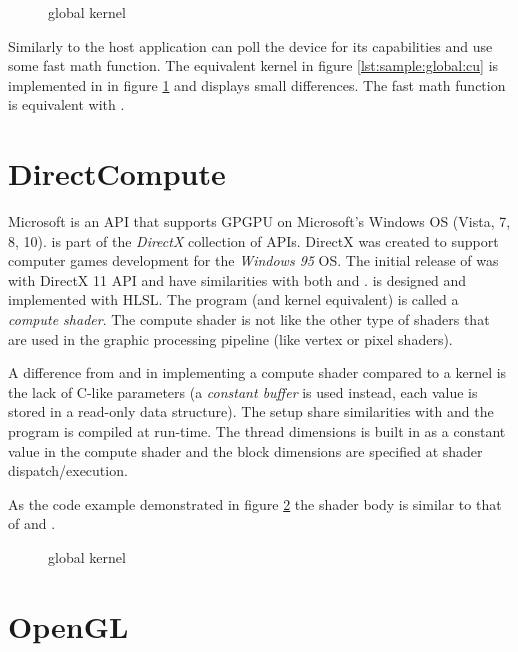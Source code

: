 \begin{figure}
	\centering
	\fbox{}
	\caption{{\OCL} global kernel}
	\label{lst:sample:global:ocl}	
\end{figure}

Similarly to {\CU} the host application can poll the device for its capabilities and use some fast math function. The equivalent {\CU} kernel in figure \ref{lst:sample:global:cu} is implemented in {\OCL} in figure \ref{lst:sample:global:ocl} and displays small differences. The {\CU} fast math function  is equivalent with .

\section{DirectCompute}

Microsoft {\DX} is an \gls{API} that supports \gls{GPGPU} on Microsoft's Windows \gls{OS} (Vista, 7, 8, 10). {\DX} is part of the \emph{DirectX} collection of APIs. DirectX was created to support computer games development for the \emph{Windows 95} OS. The initial release of {\DX} was with DirectX 11 \gls{API} and have similarities with both {\CU} and {\OCL}. {\DX} is designed and implemented with \gls{HLSL}. The program (and kernel equivalent) is called a \emph{compute shader}. The compute shader is not like the other type of shaders that are used in the graphic processing pipeline (like vertex or pixel shaders).

A difference from {\CU} and {\OCL} in implementing a compute shader compared to a kernel is the lack of C-like parameters (a \emph{constant buffer} is used instead, each value is stored in a read-only data structure). The setup share similarities with {\OCL} and the program is compiled at run-time. The thread dimensions is built in as a constant value in the compute shader and the block dimensions are specified at shader dispatch/execution.

As the code example demonstrated in figure \ref{lst:sample:global:dx} the shader body is similar to that of {\CU} and {\OCL}.

\begin{figure}
	\centering
	\fbox{}
	\caption{{\DX} global kernel}
	\label{lst:sample:global:dx}	
\end{figure}

\section{OpenGL}

